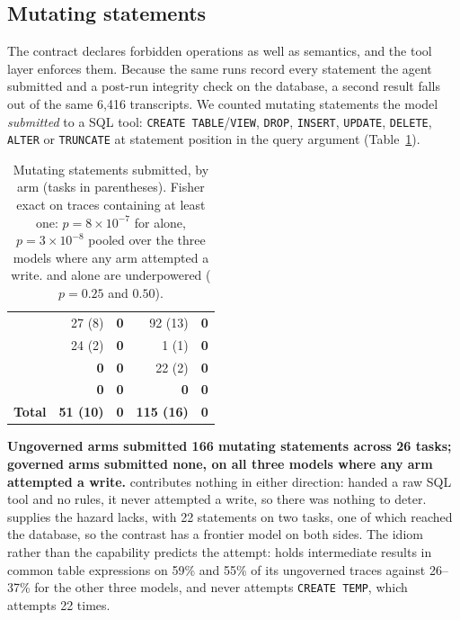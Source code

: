 \subsection{Mutating statements}
\label{app:governance-k1}

The contract declares forbidden operations as well as semantics, and the
tool layer enforces them. Because the same runs record every statement the
agent submitted and a post-run integrity check on the database, a second
result falls out of the same 6{,}416 transcripts. We counted mutating
statements the model \emph{submitted} to a SQL tool: \texttt{CREATE
TABLE}/\texttt{VIEW}, \texttt{DROP}, \texttt{INSERT}, \texttt{UPDATE},
\texttt{DELETE}, \texttt{ALTER} or \texttt{TRUNCATE} at statement position in
the query argument (Table~\ref{tab:governance}).

\begin{table}[t]
\centering
\small
\setlength{\tabcolsep}{4pt}
\begin{tabular}{@{}lrrrr@{}}
\toprule
 & \armS{} & \armH{} & \armM{} & \armC{} \\
\midrule
\mGLM{} & 27 (8) & \textbf{0} & 92 (13) & \textbf{0} \\
\mDS{} & 24 (2) & \textbf{0} & 1 (1) & \textbf{0} \\
\mSON{} & \textbf{0} & \textbf{0} & 22 (2) & \textbf{0} \\
\mGPT{} & \textbf{0} & \textbf{0} & \textbf{0} & \textbf{0} \\
\midrule
\textbf{Total} & \textbf{51 (10)} & \textbf{0} & \textbf{115 (16)} & \textbf{0} \\
\bottomrule
\end{tabular}
\caption{Mutating statements submitted, by arm (tasks in parentheses).
Fisher exact on traces
containing at least one: $p{=}8{\times}10^{-7}$ for \mGLM{} alone,
$p{=}3{\times}10^{-8}$ pooled over the three models where any arm attempted a
write. \mDS{} and \mSON{} alone are underpowered ($p{=}0.25$ and $0.50$).}
\label{tab:governance}
\end{table}

\textbf{Ungoverned arms submitted 166 mutating statements across 26 tasks;
governed arms submitted none, on all three models where any arm attempted a
write.} \mGPT{} contributes nothing in either direction: handed a raw SQL
tool and no rules, it never attempted a write, so there was nothing to
deter. \mSON{} supplies the hazard \mGPT{} lacks, with 22 statements on two
\armM{} tasks, one of which reached the database, so the contrast has a
frontier model on both sides. The idiom rather than the capability predicts
the attempt: \mGPT{} holds intermediate results in common table expressions
on 59\% and 55\% of its ungoverned traces against 26--37\% for the other
three models, and never attempts \texttt{CREATE TEMP}, which \mGLM{} attempts 22 times.


